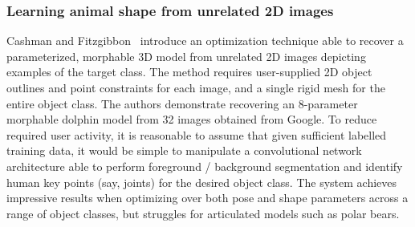 

    \subsubsection{Learning animal shape from unrelated 2D images}
    Cashman and Fitzgibbon~\cite{cashman2013shape} introduce an optimization technique able to recover a parameterized, morphable 3D model from unrelated 2D images depicting examples of the target class. The method requires user-supplied 2D object outlines and point constraints for each image, and a single rigid mesh for the entire object class. The authors demonstrate recovering an 8-parameter morphable dolphin model from 32 images obtained from Google. To reduce required user activity, it is reasonable to assume that given sufficient labelled training data, it would be simple to manipulate a convolutional network architecture able to perform foreground / background segmentation and identify human key points (say, joints) for the desired object class. The system achieves impressive results when optimizing over both pose and shape parameters across a range of object classes, but struggles for articulated models such as polar bears.

